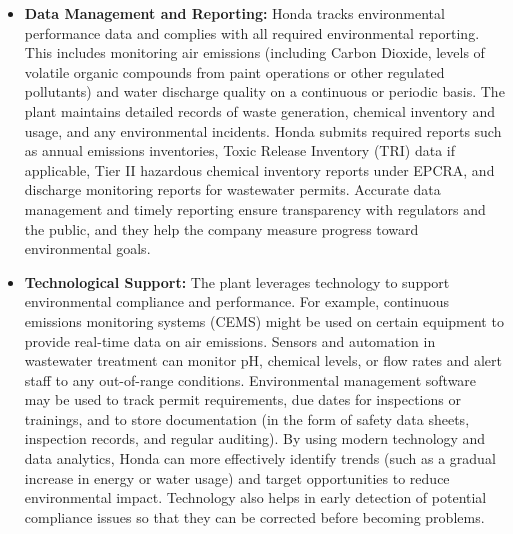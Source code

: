 \begin{itemize}
    \item \textbf{Data Management and Reporting:} Honda tracks environmental performance data and complies with all required environmental reporting. This includes monitoring air emissions (including Carbon Dioxide, levels of volatile organic compounds from paint operations or other regulated pollutants) and water discharge quality on a continuous or periodic basis. The plant maintains detailed records of waste generation, chemical inventory and usage, and any environmental incidents. Honda submits required reports such as annual emissions inventories, Toxic Release Inventory (TRI) data if applicable, Tier II hazardous chemical inventory reports under EPCRA, and discharge monitoring reports for wastewater permits. Accurate data management and timely reporting ensure transparency with regulators and the public, and they help the company measure progress toward environmental goals.
    \item \textbf{Technological Support:} The plant leverages technology to support environmental compliance and performance. For example, continuous emissions monitoring systems (CEMS) might be used on certain equipment to provide real-time data on air emissions. Sensors and automation in wastewater treatment can monitor pH, chemical levels, or flow rates and alert staff to any out-of-range conditions. Environmental management software may be used to track permit requirements, due dates for inspections or trainings, and to store documentation (in the form of safety data sheets, inspection records, and regular auditing). By using modern technology and data analytics, Honda can more effectively identify trends (such as a gradual increase in energy or water usage) and target opportunities to reduce environmental impact. Technology also helps in early detection of potential compliance issues so that they can be corrected before becoming problems.
\end{itemize}

